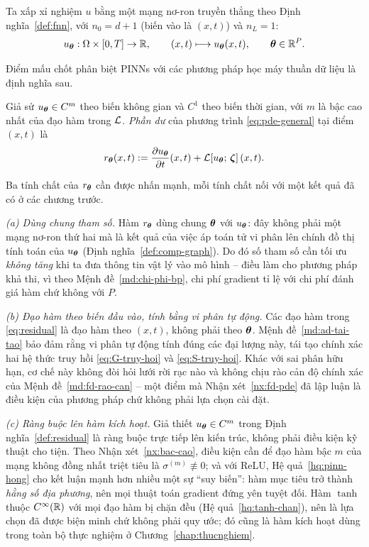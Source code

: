 Ta xấp xỉ nghiệm $u$ bằng một mạng nơ-ron truyền thẳng theo
Định nghĩa~\ref{def:fnn}, với $n_0 = d+1$ (biến vào là $(x,t)$) và $n_L = 1$:
\begin{equation}
u_{\bm{\theta}} : \Omega \times [0,T] \to \mathbb{R},
\qquad
(x,t) \longmapsto u_{\bm{\theta}}(x,t),
\qquad \bm{\theta} \in \mathbb{R}^{P}.
\label{eq:network-surrogate}
\end{equation}
 
Điểm mấu chốt phân biệt PINNs với các phương pháp học máy thuần dữ liệu là định
nghĩa sau.
 
\begin{definition}[Phần dư]
\label{def:residual}
Giả sử $u_{\bm{\theta}} \in C^{m}$ theo biến không gian và $C^1$ theo biến thời gian,
với $m$ là bậc cao nhất của đạo hàm trong $\mathcal{L}$. \emph{Phần dư} của phương
trình \eqref{eq:pde-general} tại điểm $(x,t)$ là
\begin{equation}
r_{\bm{\theta}}(x,t)
:= \frac{\partial u_{\bm{\theta}}}{\partial t}(x,t)
 + \mathcal{L}\!\left[u_{\bm{\theta}};\, \bm{\zeta}\right](x,t).
\label{eq:residual}
\end{equation}
\end{definition}
 
Ba tính chất của $r_{\bm{\theta}}$ cần được nhấn mạnh, mỗi tính chất nối với một kết
quả đã có ở các chương trước.
 
\emph{(a) Dùng chung tham số.} Hàm $r_{\bm{\theta}}$ dùng chung $\bm{\theta}$ với
$u_{\bm{\theta}}$: đây không phải một mạng nơ-ron thứ hai mà là kết quả của việc áp
toán tử vi phân lên chính đồ thị tính toán của $u_{\bm{\theta}}$
(Định nghĩa~\ref{def:comp-graph}). Do đó số tham số cần tối ưu \emph{không tăng}
khi ta đưa thông tin vật lý vào mô hình -- điều làm cho phương pháp khả thi, vì
theo Mệnh đề~\ref{md:chi-phi-bp}, chi phí gradient tỉ lệ với chi phí đánh giá hàm
chứ không với $P$.
 
\emph{(b) Đạo hàm theo biến đầu vào, tính bằng vi phân tự động.} Các đạo hàm
trong \eqref{eq:residual} là đạo hàm theo $(x,t)$, không phải theo $\bm{\theta}$.
Mệnh đề~\ref{md:ad-tai-tao} bảo đảm rằng vi phân tự động tính đúng các đại lượng
này, tái tạo chính xác hai hệ thức truy hồi \eqref{eq:G-truy-hoi} và
\eqref{eq:S-truy-hoi}. Khác với sai phân hữu hạn, cơ chế này không đòi hỏi lưới
rời rạc nào và không chịu rào cản độ chính xác của
Mệnh đề~\ref{md:fd-rao-can} -- một điểm mà Nhận xét~\ref{nx:fd-pde} đã lập luận
là điều kiện của phương pháp chứ không phải lựa chọn cài đặt.
 
\emph{(c) Ràng buộc lên hàm kích hoạt.} Giả thiết $u_{\bm{\theta}} \in C^m$ trong
Định nghĩa~\ref{def:residual} là ràng buộc trực tiếp lên kiến trúc, không phải
điều kiện kỹ thuật cho tiện. Theo Nhận xét~\ref{nx:bac-cao}, điều kiện cần để đạo
hàm bậc $m$ của mạng không đồng nhất triệt tiêu là $\sigma^{(m)} \not\equiv 0$;
và với ReLU, Hệ quả~\ref{hq:pinn-hong} cho kết luận mạnh hơn nhiều một sự ``suy
biến'': hàm mục tiêu trở thành \emph{hằng số địa phương}, nên mọi thuật toán
gradient đứng yên tuyệt đối. Hàm $\tanh$ thuộc $C^{\infty}(\mathbb{R})$ với mọi đạo hàm
bị chặn đều (Hệ quả~\ref{hq:tanh-chan}), nên là lựa chọn đã được biện minh chứ
không phải quy ước; đó cũng là hàm kích hoạt dùng trong toàn bộ thực nghiệm ở
Chương~\ref{chap:thucnghiem}.
 
